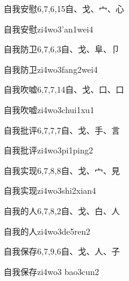 \begin{entry}{自我安慰}{6,7,6,15}{⾃、⼽、⼧、⼼}
  \begin{phonetics}{自我安慰}{zi4wo3'an1wei4}
  \end{phonetics}
\end{entry}

\begin{entry}{自我防卫}{6,7,6,3}{⾃、⼽、⾩、⼙}
  \begin{phonetics}{自我防卫}{zi4wo3fang2wei4}
  \end{phonetics}
\end{entry}

\begin{entry}{自我吹嘘}{6,7,7,14}{⾃、⼽、⼝、⼝}
  \begin{phonetics}{自我吹嘘}{zi4wo3chui1xu1}
  \end{phonetics}
\end{entry}

\begin{entry}{自我批评}{6,7,7,7}{⾃、⼽、⼿、⾔}
  \begin{phonetics}{自我批评}{zi4wo3pi1ping2}
  \end{phonetics}
\end{entry}

\begin{entry}{自我实现}{6,7,8,8}{⾃、⼽、⼧、⾒}
  \begin{phonetics}{自我实现}{zi4wo3shi2xian4}
  \end{phonetics}
\end{entry}

\begin{entry}{自我的人}{6,7,8,2}{⾃、⼽、⽩、⼈}
  \begin{phonetics}{自我的人}{zi4wo3de5ren2}
  \end{phonetics}
\end{entry}

\begin{entry}{自我保存}{6,7,9,6}{⾃、⼽、⼈、⼦}
  \begin{phonetics}{自我保存}{zi4wo3 bao3cun2}
  \end{phonetics}
\end{entry}

